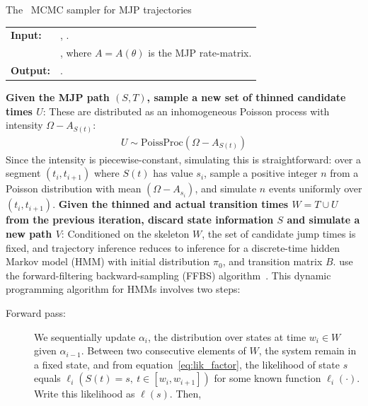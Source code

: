 \begin{algorithm}[H]
  \caption{The~\cite{RaoTeh13} MCMC sampler for MJP trajectories}
   \label{alg:Unif_gibbs}
  \begin{tabular}{l l}
   \textbf{Input:  } & \text{MJP parameters $\theta$, $\pi_0$, observations $X$}, 
                       \text{the previous path $S(t) = (S, T)$}.\\ 
                     & \text{A  parameter $\Omega > \max_i A_i$}, where
   $A = A(\theta)$ is the MJP rate-matrix.\\
   \textbf{Output:  }& \text{A new MJP trajectory $S' (t) = (S', T')$}.\\
   \hline
   \end{tabular}
   \begin{algorithmic}[1]
\State \textbf{Given the MJP path $(S,T)$, sample a new set of thinned 
candidate times $U$}: 
These are distributed as an inhomogeneous Poisson process with intensity $\Omega-A_{S(t)}$: 
\begin{align*}
  U \sim \text{PoissProc}(\Omega - A_{S(t)}) 
\end{align*}
Since the intensity is piecewise-constant, simulating this is straightforward: over a segment $(t_{i},t_{i+1})$ where $S(t)$ has value $s_i$, sample a positive integer $n$ from a Poisson distribution with mean $(\Omega-A_{s_i})$, and simulate $n$ events uniformly over $(t_i, t_{i+1})$.
\State \textbf{Given the thinned and actual transition times $W = T \cup U$ from the previous iteration, discard state information $S$ and simulate
a new path $V$}:
Conditioned on the skeleton $W$, the set of candidate jump times is fixed, and trajectory inference reduces to inference for a discrete-time hidden Markov model (HMM) with initial distribution $\pi_0$, and transition matrix $B$. 
\cite{RaoTeh13} use the forward-filtering backward-sampling (FFBS) algorithm~\citep{dsfs}. This dynamic programming algorithm for HMMs involves two steps:
\begin{description}
  \item[Forward pass:] We sequentially update $\alpha_i$, the distribution over states at time $w_i \in W$ given $\alpha_{i-1}$. 
    Between two consecutive elements of $W$, the system remain in a fixed state, and from equation~\eqref{eq:lik_factor}, the likelihood of state $s$ equals $\ell_i(S(t) = s,\ t \in [w_i,w_{i+1}])$ for some known function $\ell_i(\cdot)$. Write this likelihood as $\ell(s)$. Then, 

\end{description}
\end{algorithmic}
\end{algorithm}
